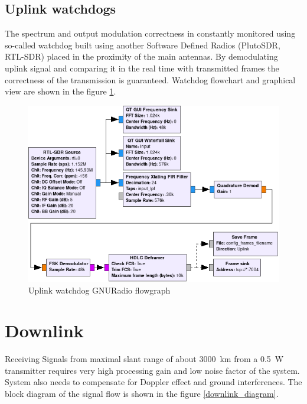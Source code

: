 \subsection{Uplink watchdogs}
The spectrum and output modulation correctness in constantly monitored using so-called watchdog built using another Software Defined Radios (PlutoSDR, RTL-SDR) placed in the proximity of the main antennas.
By demodulating uplink signal and comparing it in the real time with transmitted frames the correctness of the transmission is guaranteed. Watchdog flowchart and graphical view are shown in the figure \ref{uplink_watchdog_flowgraph}.

\begin{figure}[H]
    \centering
    \includegraphics[width=0.8\paperwidth]{img/7/uplink_watchdog_flowgraph.png}
    \caption{Uplink watchdog GNURadio flowgraph}
    \label{uplink_watchdog_flowgraph}
\end{figure}

\newpage



\section{Downlink}
Receiving Signals from maximal slant range of about \SI{3000}{\kilo\meter} from a \SI{0.5}{\watt} transmitter requires very high processing gain and low noise factor of the system. System also needs to compensate for Doppler effect and ground interferences. The block diagram of the signal flow is shown in the figure \ref{downlink_diagram}.

